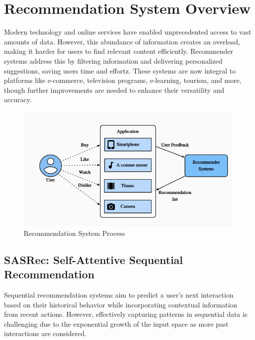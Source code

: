 \section{Recommendation System Overview}
Modern technology and online services have enabled unprecedented access to vast amounts of data. However, this abundance of information creates an overload, making it harder for users to find relevant content efficiently. Recommender systems address this by filtering information and delivering personalized suggestions, saving users time and effortz\cite{Roy2022}. These systems are now integral to platforms like e-commerce, television programs\cite{5174476}, e-learning\cite{WANG201110831}, tourism, and more, though further improvements are needed to enhance their versatility and accuracy.
\begin{figure}[ht]
	\centering
	\includegraphics[width=0.5\linewidth]{Figures/RS.png}
	\caption{Recommendation System Process\cite{zhang2021recsys}}
	\label{Recommendation_System _Process}	
\end{figure}
\subsection{SASRec: Self-Attentive Sequential Recommendation}
Sequential recommendation systems aim to predict a user’s next interaction based on their historical behavior while incorporating contextual information from recent actions. However, effectively capturing patterns in sequential data is challenging due to the exponential growth of the input space as more past interactions are considered.\cite{kang2018selfat}
